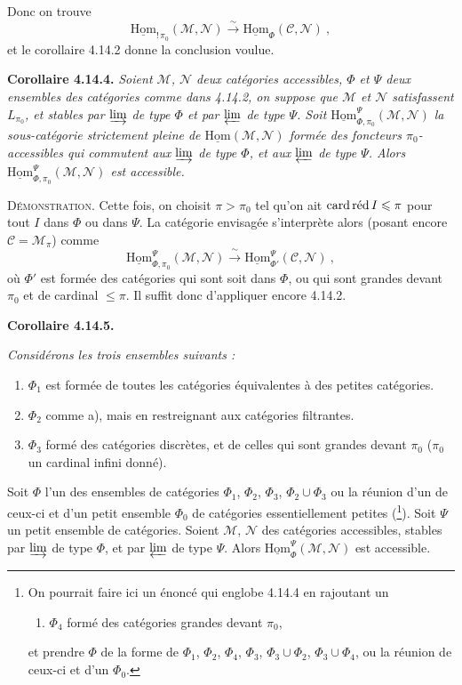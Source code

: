 \documentclass[11pt]{article}
\newcommand{\printedpage}[1]{\marginpar{\footnotesize p.~#1}}
\newcommand{\msp}[1]{\marginpar{\footnotesize [#1]}}
\newcommand{\uHom}{\underline{\mathrm{Hom}}}
\newcommand{\cardred}{\mathop{\textup{card\,réd}}}
\begin{document}
\msp{page 374}

Donc on trouve
\[
\uHom_{!\,\pi_0}(\mathcal{M},\mathcal{N}) \xrightarrow{\ \sim\ } \uHom_{\Phi}(\mathcal{C},\mathcal{N})\ ,
\]
\printedpage{142}
et le corollaire 4.14.2 donne la conclusion voulue.

\noindent\textbf{Corollaire 4.14.4.} {\itshape Soient $\mathcal{M}$, $\mathcal{N}$ deux catégories accessibles, $\Phi$ et $\Psi$ deux ensembles des catégories comme dans 4.14.2, on suppose que $\mathcal{M}$ et $\mathcal{N}$ satisfassent $L_{\pi_0}$, et stables par $\varinjlim$ de type $\Phi$ et par $\varprojlim$ de type $\Psi$. Soit $\uHom^{\Psi}_{\Phi,\pi_0}(\mathcal{M},\mathcal{N})$ la sous-catégorie strictement pleine de $\uHom(\mathcal{M},\mathcal{N})$ formée des foncteurs $\pi_0$-accessibles qui commutent aux $\varinjlim$ de type $\Phi$, et aux $\varprojlim$ de type $\Psi$. Alors $\uHom^{\Psi}_{\Phi,\pi_0}(\mathcal{M},\mathcal{N})$ est accessible.}

\noindent\textsc{Démonstration}. Cette fois, on choisit $\pi>\pi_0$ tel qu'on ait $\cardred I\leqslant\pi$ pour tout $I$ dans $\Phi$ ou dans $\Psi$. La catégorie envisagée s'interprète alors (posant encore $\mathcal{C}=\mathcal{M}_\pi$) comme
\msp{page 375}
\[
\uHom^{\Psi}_{\Phi,\pi_0}(\mathcal{M},\mathcal{N}) \xrightarrow{\ \sim\ } \uHom^{\Psi}_{\Phi'}(\mathcal{C},\mathcal{N})\ ,
\]
où $\Phi'$ est formée des catégories qui sont soit dans $\Phi$, ou qui sont grandes devant $\pi_0$ et de cardinal $\leqslant\pi$. Il suffit donc d'appliquer encore 4.14.2.

\noindent\textbf{Corollaire 4.14.5.} {\itshape Considérons les trois ensembles suivants :
\begin{enumerate}[leftmargin=2.5em]
\item[\textit{a)}] $\Phi_1$ est formée de toutes les catégories équivalentes à des petites catégories.
\item[\textit{b)}] $\Phi_2$ comme a), mais en restreignant aux catégories filtrantes.
\item[\textit{c)}] $\Phi_3$ formé des catégories discrètes, et de celles qui sont grandes devant $\pi_0$ ($\pi_0$ un cardinal infini donné).
\end{enumerate}
\noindent Soit $\Phi$ l'un des ensembles de catégories $\Phi_1$, $\Phi_2$, $\Phi_3$, $\Phi_2\cup\Phi_3$ ou la réunion d'un de ceux-ci et d'un petit ensemble $\Phi_0$ de catégories essentiellement petites (\footnote[165]{On pourrait faire ici un énoncé qui englobe 4.14.4 en rajoutant un
\begin{enumerate}[leftmargin=2.5em]
\item[d)] $\Phi_4$ formé des catégories grandes devant $\pi_0$,
\end{enumerate}
\noindent et prendre $\Phi$ de la forme de $\Phi_1$, $\Phi_2$, $\Phi_4$, $\Phi_3$, $\Phi_3\cup\Phi_2$, $\Phi_3\cup\Phi_4$, ou la réunion de ceux-ci et d'un $\Phi_0$.}). Soit $\Psi$ un petit ensemble de catégories. Soient $\mathcal{M}$, $\mathcal{N}$ des catégories accessibles, stables par $\varinjlim$ de type $\Phi$, et par $\varprojlim$ de type $\Psi$. Alors $\uHom^{\Psi}_{\Phi}(\mathcal{M},\mathcal{N})$ est accessible.}
\end{document}
